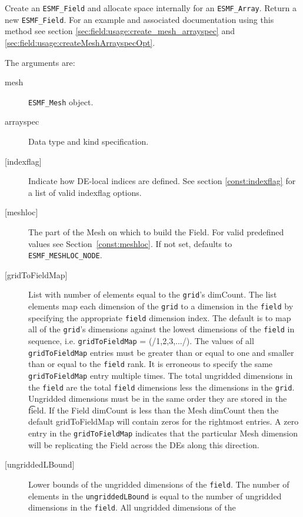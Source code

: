    Create an {\tt ESMF\_Field} and allocate space internally for an
   {\tt ESMF\_Array}. Return a new {\tt ESMF\_Field}. For an example and
   associated documentation using this method see section
   \ref{sec:field:usage:create_mesh_arrayspec} and
   \ref{sec:field:usage:createMeshArrayspecOpt}.
  
   The arguments are:
   \begin{description}
   \item [mesh]
   {\tt ESMF\_Mesh} object.
   \item [arrayspec]
   Data type and kind specification.
   \item [{[indexflag]}]
   Indicate how DE-local indices are defined. See section
   \ref{const:indexflag} for a list of valid indexflag options.
   \item [{[meshloc]}]
   \begin{sloppypar}
   The part of the Mesh on which to build the Field. For valid
   predefined values see Section~\ref{const:meshloc}.
   If not set, defaults to {\tt ESMF\_MESHLOC\_NODE}.
   \end{sloppypar}
   \item [{[gridToFieldMap]}]
   List with number of elements equal to the
   {\tt grid}'s dimCount. The list elements map each dimension
   of the {\tt grid} to a dimension in the {\tt field} by
   specifying the appropriate {\tt field} dimension index. The default is to
   map all of the {\tt grid}'s dimensions against the lowest dimensions of
   the {\tt field} in sequence, i.e. {\tt gridToFieldMap} = (/1,2,3,.../).
   The values of all {\tt gridToFieldMap} entries must be greater than or equal
   to one and smaller than or equal to the {\tt field} rank.
   It is erroneous to specify the same {\tt gridToFieldMap} entry
   multiple times. The total ungridded dimensions in the {\tt field}
   are the total {\tt field} dimensions less
   the dimensions in
   the {\tt grid}. Ungridded dimensions must be in the same order they are
   stored in the {\t field}.
   If the Field dimCount is less than the Mesh dimCount then the default
   gridToFieldMap will contain zeros for the rightmost entries. A zero
   entry in the {\tt gridToFieldMap} indicates that the particular
   Mesh dimension will be replicating the Field across the DEs along
   this direction.
   \item [{[ungriddedLBound]}]
   Lower bounds of the ungridded dimensions of the {\tt field}.
   The number of elements in the {\tt ungriddedLBound} is equal to the number of ungridded
   dimensions in the {\tt field}. All ungridded dimensions of the

\end{description}
